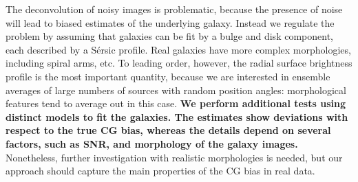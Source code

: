 \documentclass[useAMS,usenatbib]{mnras}
\begin{document}
%
The deconvolution of noisy images is problematic, because the presence of noise will lead to biased estimates of the underlying galaxy. Instead we regulate the problem by assuming that galaxies can be fit by a bulge and disk component, each described by a S{\'e}rsic profile. Real galaxies have more complex morphologies, including spiral arms, etc. To leading order, however, the radial surface brightness profile is the most important quantity, because we are interested in ensemble averages of large numbers of sources with random position angles: morphological features tend to average out in this case. {\bf We perform additional tests using distinct models to fit the galaxies. The estimates show deviations with respect to the true CG bias, whereas the details depend on several factors, such as SNR, and morphology of the galaxy images.} Nonetheless, further investigation with realistic morphologies is needed, but our approach should capture the main properties of the CG bias in real data.
\end{document}
